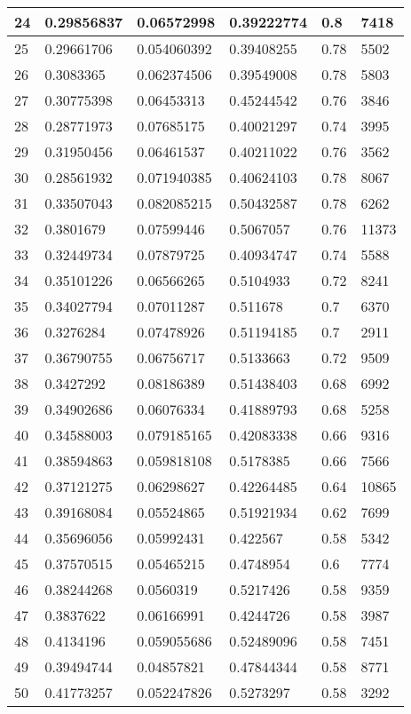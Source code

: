 \begin{longtable}{|l|l|l|l|l|l|}
24 & 0.29856837 & 0.06572998 & 0.39222774 & 0.8 & 7418 \\ \hline 
25 & 0.29661706 & 0.054060392 & 0.39408255 & 0.78 & 5502 \\ \hline 
26 & 0.3083365 & 0.062374506 & 0.39549008 & 0.78 & 5803 \\ \hline 
27 & 0.30775398 & 0.06453313 & 0.45244542 & 0.76 & 3846 \\ \hline 
28 & 0.28771973 & 0.07685175 & 0.40021297 & 0.74 & 3995 \\ \hline 
29 & 0.31950456 & 0.06461537 & 0.40211022 & 0.76 & 3562 \\ \hline 
30 & 0.28561932 & 0.071940385 & 0.40624103 & 0.78 & 8067 \\ \hline 
31 & 0.33507043 & 0.082085215 & 0.50432587 & 0.78 & 6262 \\ \hline 
32 & 0.3801679 & 0.07599446 & 0.5067057 & 0.76 & 11373 \\ \hline 
33 & 0.32449734 & 0.07879725 & 0.40934747 & 0.74 & 5588 \\ \hline 
34 & 0.35101226 & 0.06566265 & 0.5104933 & 0.72 & 8241 \\ \hline 
35 & 0.34027794 & 0.07011287 & 0.511678 & 0.7 & 6370 \\ \hline 
36 & 0.3276284 & 0.07478926 & 0.51194185 & 0.7 & 2911 \\ \hline 
37 & 0.36790755 & 0.06756717 & 0.5133663 & 0.72 & 9509 \\ \hline 
38 & 0.3427292 & 0.08186389 & 0.51438403 & 0.68 & 6992 \\ \hline 
39 & 0.34902686 & 0.06076334 & 0.41889793 & 0.68 & 5258 \\ \hline 
40 & 0.34588003 & 0.079185165 & 0.42083338 & 0.66 & 9316 \\ \hline 
41 & 0.38594863 & 0.059818108 & 0.5178385 & 0.66 & 7566 \\ \hline 
42 & 0.37121275 & 0.06298627 & 0.42264485 & 0.64 & 10865 \\ \hline 
43 & 0.39168084 & 0.05524865 & 0.51921934 & 0.62 & 7699 \\ \hline 
44 & 0.35696056 & 0.05992431 & 0.422567 & 0.58 & 5342 \\ \hline 
45 & 0.37570515 & 0.05465215 & 0.4748954 & 0.6 & 7774 \\ \hline 
46 & 0.38244268 & 0.0560319 & 0.5217426 & 0.58 & 9359 \\ \hline 
47 & 0.3837622 & 0.06166991 & 0.4244726 & 0.58 & 3987 \\ \hline 
48 & 0.4134196 & 0.059055686 & 0.52489096 & 0.58 & 7451 \\ \hline 
49 & 0.39494744 & 0.04857821 & 0.47844344 & 0.58 & 8771 \\ \hline 
50 & 0.41773257 & 0.052247826 & 0.5273297 & 0.58 & 3292 \\ \hline 
\end{longtable}